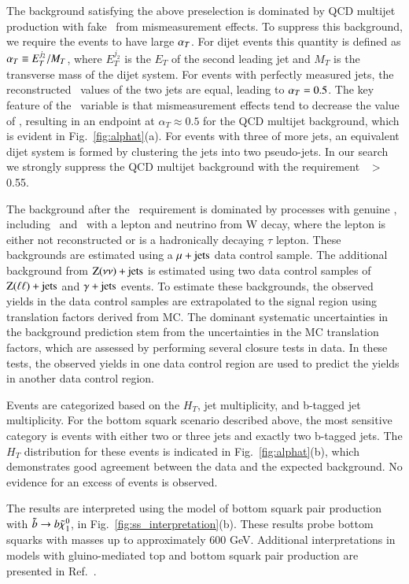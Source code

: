 The background satisfying the above preselection is dominated by QCD multijet production with fake \met\ from mismeasurement effects. To suppress this background,
we require the events to have large $\alpha_{T}$. For dijet events this quantity is defined as $\alpha_{T} \equiv E_{T}^{j_2} / M_{T}$, where $E_{T}^{j_2}$ is the $E_T$
of the second leading jet and $M_T$ is the transverse mass of the dijet system. 
For events with perfectly measured jets, the reconstructed \pt\ values of the two jets are equal, leading to $\alpha_{T}=0.5$. 
The key feature of the \alphat\ variable is that mismeasurement effects tend to decrease the value of \alphat,
resulting in an endpoint at $\alpha_T\approx0.5$ for the QCD multijet background, which is evident in Fig.~\ref{fig:alphat}(a).
For events with three of more jets, an equivalent dijet 
system is formed by  clustering the jets into two pseudo-jets. In our search we strongly suppress the QCD multijet background with 
the requirement \alphat\ $>$ 0.55.

The background after the \alphat\ requirement is dominated by processes with genuine \met, including \ttljets\ and \wjets\ with a lepton and neutrino from W decay,
where the lepton is either not reconstructed or is a hadronically decaying $\tau$ lepton. 
These backgrounds are estimated using a $\mu+\rm{jets}$ data control sample.
The additional background from $\rm{Z}(\nu\nu)+\rm{jets}$ is estimated using two data control samples of $\rm{Z}(\ell\ell)+\rm{jets}$ and  $\gamma+\rm{jets}$ events. To estimate these backgrounds, the observed yields in the data control samples are extrapolated to the
signal region using translation factors derived from MC. The dominant systematic uncertainties in the background prediction stem from the uncertainties
in the MC translation factors, which are assessed by performing several closure tests in data. In these tests, the observed yields in one data control region
are used to predict the yields in another data control region.

Events are categorized based on the $H_T$, jet multiplicity, and b-tagged jet multiplicity. For the bottom squark scenario described above, the most sensitive
category is events with either two or three jets and exactly two b-tagged jets. The $H_T$ distribution for these events is indicated in Fig.~\ref{fig:alphat}(b),
which demonstrates good agreement between the data and the expected background. No evidence for an excess of events is observed.

The results are interpreted  using the model of bottom squark pair production with $\tilde{b}\to b\tilde{\chi}_{1}^{0}$, in Fig.~\ref{fig:ss_interpretation}(b).
These results probe bottom squarks with masses up to approximately 600 GeV. Additional interpretations in models with gluino-mediated
top and bottom squark pair production are presented in Ref.~\cite{ref:alphat}.

